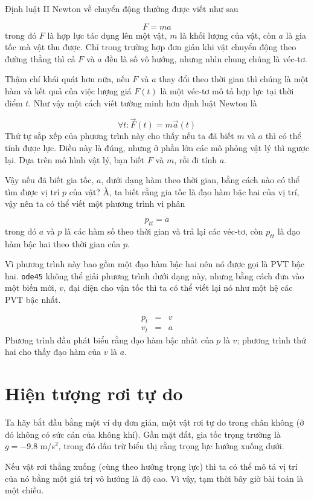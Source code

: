 \documentclass[12pt]{book}
\begin{document}
Định luật II Newton về chuyển động thường được viết như sau

\[ F = ma \]
%
trong đó $F$ là hợp lực tác dụng lên một vật, $m$ là khối lượng của
vật, còn $a$ là gia tốc mà vật thu được. Chỉ trong trường hợp đơn giản
khi vật chuyển động theo đường thẳng thì cả $F$ và $a$ đều là 
số vô hướng, nhưng nhìn chung chúng là véc-tơ.

Thậm chí khái quát hơn nữa, nếu $F$ và $a$ thay đổi theo thời gian
thì chúng là một hàm và kết quả của việc lượng giá $F(t)$ là một
véc-tơ mô tả hợp lực tại thời điểm $t$. Như vậy một cách viết 
tường minh hơn định luật Newton là

\[ \forall t: \vec{F}(t) = m \vec{a}(t) \]
%
Thứ tự sắp xếp của phương trình này cho thấy nếu ta đã biết $m$ 
và $a$ thì có thể tính được lực. Điều này là đúng, nhưng ở
phần lớn các mô phỏng vật lý thì ngược lại. Dựa trên mô hình 
vật lý, bạn biết $F$ và $m$, rồi đi tính $a$.

Vậy nếu đã biết gia tốc, $a$, dưới dạng hàm theo thời gian, bằng
cách nào có thể tìm được vị trí $p$ của vật? À, ta biết rằng gia tốc
là đạo hàm bậc hai của vị trí, vậy nên ta có thể viết một phương
trình vi phân

\[ p_{tt} = a \]
%
trong đó $a$ và $p$ là các hàm số theo thời gian và trả lại các
véc-tơ, còn $p_{tt}$ là đạo hàm bậc hai theo thời gian của $p$.

Vì phương trình này bao gồm một đạo hàm bậc hai nên nó được gọi là
PVT bậc hai. {\tt ode45} không thể giải phương trình dưới dạng này,
nhưng bằng cách đưa vào một biến mới, $v$, đại diện cho vận tốc
thì ta có thể viết lại nó như một hệ các PVT bậc nhất.

\begin{eqnarray*}
p_t &=& v \\
v_t &=& a
\end{eqnarray*}
%
Phương trình đầu phát biểu rằng đạo hàm bậc nhất của $p$ là $v$; 
phương trình thứ hai cho thấy đạo hàm của $v$ là $a$.


\section{Hiện tượng rơi tự do}
\label{freefall}

Ta hãy bắt đầu bằng một ví dụ đơn giản, một vật rơi tự do trong
chân không (ở đó không có sức cản của không khí). Gần mặt đất,
gia tốc trọng trường là $g = -9.8$ m/s$^2$, trong đó dấu trừ
biểu thị rằng trọng lực hướng xuống dưới.

Nếu vật rơi thẳng xuống (cùng theo hướng trọng lực) thì ta
có thể mô tả vị trí của nó bằng một giá trị vô hướng là độ cao.
Vì vậy, tạm thời bây giờ bài toán là một chiều.
\end{document}
